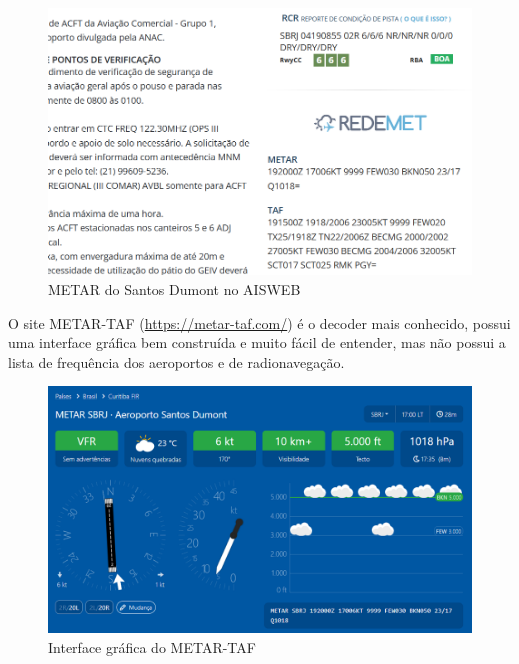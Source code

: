 \begin{figure}[ht]
    \begin{center}
    \includegraphics[width=400pt]{img/metar-aisweb.png}
    \caption{METAR do Santos Dumont no AISWEB}
    \label{fig:aisweb}
    \end{center}
\end{figure}

O site METAR-TAF (\url{https://metar-taf.com/}) é o decoder mais conhecido, possui uma interface 
gráfica bem construída
e muito fácil de entender, mas não possui a lista de frequência dos aeroportos e
de radionavegação.

\begin{figure}[ht]
    \begin{center}
    \includegraphics[width=400pt]{img/ui-metar-taf.png}
    \caption{Interface gráfica do METAR-TAF}
    \label{fig:metar-taf}
    \end{center}
\end{figure}
